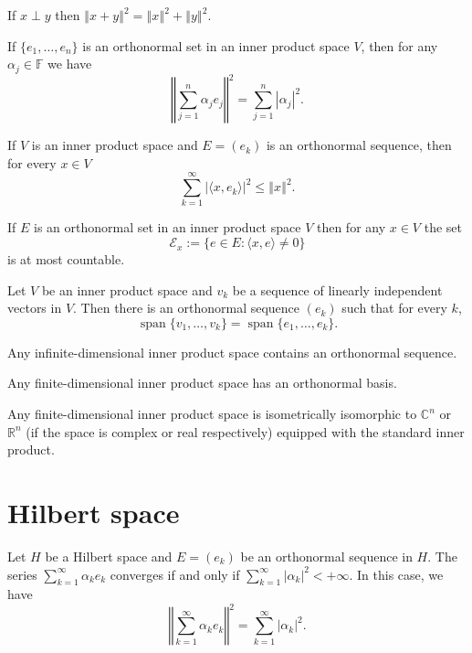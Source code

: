 \documentclass[a4paper]{article}
\newcommand{\F}{\mathbb{F}}
\newcommand{\R}{\mathbb{R}}
\renewcommand{\C}{\mathbb{C}}
\newcommand{\norm}[1]{\left\Vert #1 \right\Vert}
\newcommand{\<}{\langle}
\renewcommand{\>}{\rangle}
\renewcommand{\a}{\alpha}
\renewcommand{\span}{\operatorname{span}}
\begin{document}
\begin{thm}[Pythagoras]
  If $x\perp y$ then $\norm{x+y}^2 = \norm{x}^2 + \norm{y}^2$.
\end{thm}

\begin{lemma}
  If $\{e_1,\ldots,e_n\}$ is an orthonormal set in an inner product space $V$, then for any $\a_j\in\F$ we have
  $$\norm{\sum_{j=1}^n\a_j e_j}^2 = \sum_{j=1}^n|\a_j|^2.$$
\end{lemma}

\begin{lemma}
  If $V$ is an inner product space and $E=(e_k)$ is an orthonormal sequence, then for every $x\in V$
  $$\sum_{k=1}^\infty|\<x,e_k\>|^2\leq\norm{x}^2.$$
\end{lemma}

\begin{prop}
  If $E$ is an orthonormal set in an inner product space $V$ then for any $x\in V$ the set
  $$\mathcal{E}_x := \{e\in E: \<x,e\>\neq0\}$$
  is at most countable.
\end{prop}

\begin{lemma}
  Let $V$ be an inner product space and $v_k$ be a sequence of linearly independent vectors in $V$. Then there is an orthonormal sequence $(e_k)$ such that for every $k$,
  $$\span\{v_1,\ldots,v_k\} = \span\{e_1,\ldots,e_k\}.$$
\end{lemma}

\begin{prop}
  Any infinite-dimensional inner product space contains an orthonormal sequence.
\end{prop}

\begin{prop}
  Any finite-dimensional inner product space has an orthonormal basis.
\end{prop}

\begin{prop}
  Any finite-dimensional inner product space is isometrically isomorphic to $\C^n$ or $\R^n$ (if the space is complex or real respectively) equipped with the standard inner product.
\end{prop}

\section{Hilbert space}

\begin{lemma}
  Let $H$ be a Hilbert space and $E=(e_k)$ be an orthonormal sequence in $H$. The series $\sum_{k=1}^\infty \a_k e_k$ converges if and only if $\sum_{k=1}^\infty |\a_k|^2 < +\infty$. In this case, we have
  $$\norm{\sum_{k=1}^\infty \a_k e_k}^2 = \sum_{k=1}^\infty|\a_k|^2.$$
\end{lemma}
\end{document}
